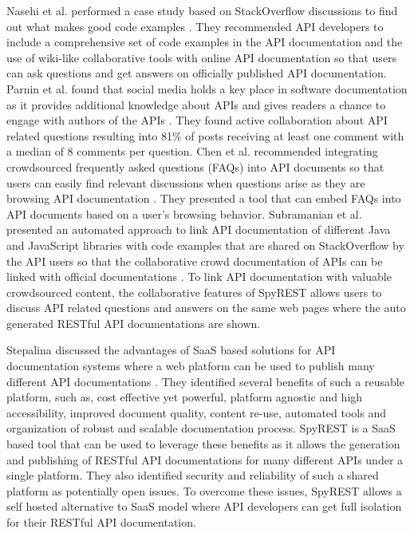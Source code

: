 \documentclass[conference]{IEEEtran}
\begin{document}
Nasehi et al. performed a case study based on StackOverflow discussions to find out what makes good code examples \cite{Nasehi_what_makes}. They recommended API developers to include a comprehensive set of code examples in the API documentation and the use of wiki-like collaborative tools with online API documentation so that users can ask questions and get answers on officially published API documentation. Parnin et al. found that social media holds a key place in software documentation as  it provides additional knowledge about APIs and gives readers a chance to engage with authors of the APIs \cite{Parnin_measuring}. They found active collaboration about API related questions resulting into 81\% of posts receiving at least one comment with a median of 8 comments per question. Chen et al. recommended integrating crowdsourced frequently asked questions (FAQs) into API documents so that users can easily find relevant discussions when questions arise as they are browsing API documentation \cite{Chen_who_asked}. They presented a tool that can embed FAQs into API documents based on a user's browsing behavior. Subramanian et al. presented an automated approach to link API documentation of different Java and JavaScript libraries with code examples that are shared on StackOverflow by the API users so that the collaborative crowd documentation of APIs can be linked with official documentations \cite{Subramanian_live}. To link API documentation with valuable crowdsourced content, the collaborative features of SpyREST allows users to discuss API related questions and answers on the same web pages where the auto generated RESTful API documentations are shown.

Stepalina discussed the advantages of SaaS based solutions for API documentation systems where a web platform can be used to publish many different API documentations \cite{Stepalina_saas}. They identified several benefits of such a reusable platform, such as, cost effective yet powerful, platform agnostic and high accessibility, improved document quality, content re-use, automated tools and organization of robust and scalable documentation process. SpyREST is a SaaS based tool that can be used to leverage these benefits as it allows the generation and publishing of RESTful API documentations for many different APIs under a single platform. They also identified security and reliability of such a shared platform as potentially open issues. To overcome these issues, SpyREST allows a self hosted alternative to SaaS model where API developers can get full isolation for their RESTful API documentation.
\end{document}
